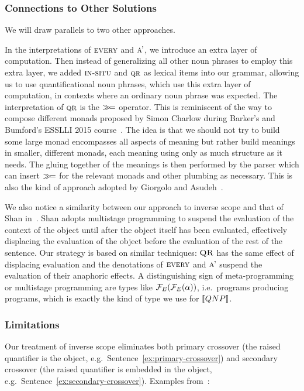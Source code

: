 \subsubsection{Connections to Other Solutions}

We will draw parallels to two other approaches.

In the interpretations of $\textsc{every}$ and $\textsc{a'}$, we introduce an
extra layer of computation. Then instead of generalizing all other noun
phrases to employ this extra layer, we added $\textsc{in-situ}$ and $\textsc{qr}$
as lexical items into our grammar, allowing us to use quantificational noun
phrases, which use this extra layer of computation, in contexts where an
ordinary noun phrase was expected. The interpretation of $\textsc{qr}$ is the
$\mathbin{\gg\!=}$ operator. This is reminiscent of the way to compose different
monads proposed by Simon Charlow during Barker's and Bumford's ESSLLI 2015
course~\cite{barker2015monads}. The idea is that we should not try to build
some large monad encompasses all aspects of meaning but rather build
meanings in smaller, different monads, each meaning using only as much
structure as it needs. The gluing together of the meanings is then
performed by the parser which can insert $\mathbin{\gg\!=}$ for the relevant monads
and other plumbing as necessary. This is also the kind of approach adopted
by Giorgolo and Asudeh~\cite{giorgolo2015natural}.

We also notice a similarity between our approach to inverse scope and that
of Shan in~\cite{shan2007inverse}. Shan adopts multistage programming to
suspend the evaluation of the context of the object until after the object
itself has been evaluated, effectively displacing the evaluation of the
object before the evaluation of the rest of the sentence. Our strategy is
based on similar techniques: $\textsc{QR}$ has the same effect of displacing
evaluation and the denotations of $\textsc{every}$ and $\textsc{a'}$ suspend the
evaluation of their anaphoric effects. A distinguishing sign of
meta-programming or multistage programming are types like
$\mathcal{F}_E(\mathcal{F}_E(\alpha))$, i.e.\ programs producing programs, which is exactly
the kind of type we use for $\llbracket QNP \rrbracket$.


\subsubsection{Limitations}

Our treatment of inverse scope eliminates both primary crossover (the
raised quantifier is the object, e.g.\ Sentence~\ref{ex:primary-crossover})
and secondary crossover (the raised quantifier is embedded in the object,
e.g.\ Sentence~\ref{ex:secondary-crossover}). Examples
from~\cite{shan2006explaining}:

